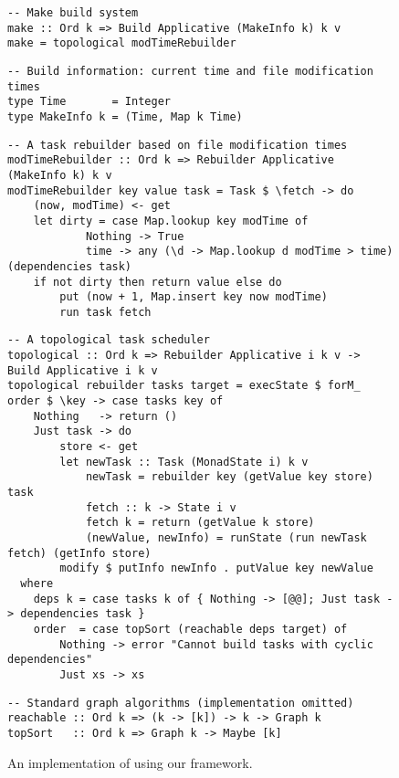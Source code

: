 \begin{figure}
\begin{verbatim}
-- Make build system
make :: Ord k => Build Applicative (MakeInfo k) k v
make = topological modTimeRebuilder
\end{verbatim}
\vspace{0mm}
\begin{verbatim}
-- Build information: current time and file modification times
type Time       = Integer
type MakeInfo k = (Time, Map k Time)
\end{verbatim}
\vspace{0mm}
\begin{verbatim}
-- A task rebuilder based on file modification times
modTimeRebuilder :: Ord k => Rebuilder Applicative (MakeInfo k) k v
modTimeRebuilder key value task = Task $ \fetch -> do
    (now, modTime) <- get
    let dirty = case Map.lookup key modTime of
            Nothing -> True
            time -> any (\d -> Map.lookup d modTime > time) (dependencies task)
    if not dirty then return value else do
        put (now + 1, Map.insert key now modTime)
        run task fetch
\end{verbatim}
\vspace{0mm}
\begin{verbatim}
-- A topological task scheduler
topological :: Ord k => Rebuilder Applicative i k v -> Build Applicative i k v
topological rebuilder tasks target = execState $ forM_ order $ \key -> case tasks key of
    Nothing   -> return ()
    Just task -> do
        store <- get
        let newTask :: Task (MonadState i) k v
            newTask = rebuilder key (getValue key store) task
            fetch :: k -> State i v
            fetch k = return (getValue k store)
            (newValue, newInfo) = runState (run newTask fetch) (getInfo store)
        modify $ putInfo newInfo . putValue key newValue
  where
    deps k = case tasks k of { Nothing -> [@@]; Just task -> dependencies task }
    order  = case topSort (reachable deps target) of
        Nothing -> error "Cannot build tasks with cyclic dependencies"
        Just xs -> xs
\end{verbatim}
\vspace{0mm}
\begin{verbatim}
-- Standard graph algorithms (implementation omitted)
reachable :: Ord k => (k -> [k]) -> k -> Graph k
topSort   :: Ord k => Graph k -> Maybe [k]
\end{verbatim}
\vspace{-2mm}
\caption{An implementation of \Make using our framework.}\label{fig-make-implementation}
\vspace{-4mm}
\end{figure}

